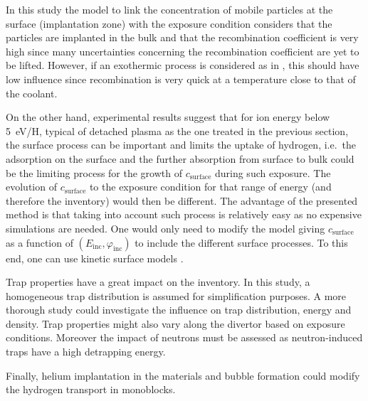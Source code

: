 In this study the model to link the concentration of mobile particles at the surface (implantation zone) with the exposure condition considers that the particles are implanted in the bulk and that the recombination coefficient is very high since many uncertainties concerning the recombination coefficient are yet to be lifted.
However, if an exothermic process is considered as in , this should have low influence since recombination is very quick at a temperature close to that of the coolant.

On the other hand, experimental results  suggest that for ion energy below \SI{5}{eV/H}, typical of detached plasma as the one treated in the previous section, the surface process can be important and limits the uptake of hydrogen, i.e.\ the adsorption on the surface and the further absorption from surface to bulk could be the limiting process for the growth of $c_\mathrm{surface}$ during such exposure.
The evolution of $c_\mathrm{surface}$ to the exposure condition for that range of energy (and therefore the inventory) would then be different.
The advantage of the presented method is that taking into account such process is relatively easy as no expensive simulations are needed.
One would only need to modify the model giving $c_\mathrm{surface}$
as a function of $(E_\mathrm{inc},\varphi_\mathrm{inc})$ to include the different surface processes.
To this end, one can use kinetic surface models .

Trap properties have a great impact on the inventory.
In this study, a homogeneous trap distribution is assumed for simplification purposes.
A more thorough study could investigate the influence on trap distribution, energy and density.
Trap properties might also vary along the divertor based on exposure conditions.
Moreover the impact of neutrons must be assessed as neutron-induced traps have a high detrapping energy.



Finally, helium implantation in the materials and bubble formation could modify the hydrogen transport in monoblocks.

